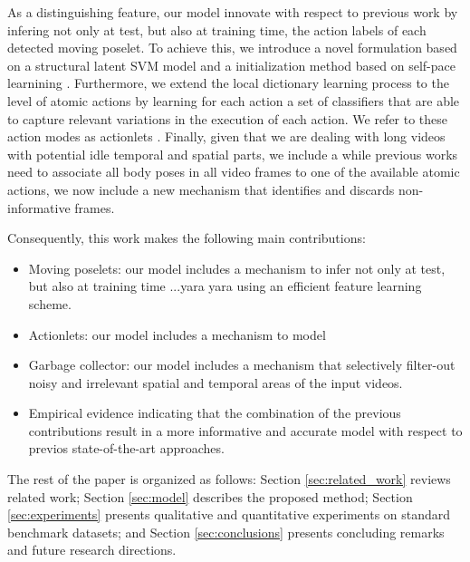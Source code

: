 As a distinguishing feature, our model innovate with respect to previous work by
infering not only at test, but also at training time, the action labels of each
detected moving poselet. To achieve this, we introduce a novel formulation based
on a structural latent SVM model \cite{} and a initialization method based on
self-pace learnining \cite{}. Furthermore, we extend the local dictionary
learning process to the level of atomic actions by learning for each action a
set of classifiers that are able to capture relevant variations in the execution
of each action. We refer to these action modes as actionlets \cite{}. Finally,
given that we are dealing with long videos with potential idle temporal and
spatial parts, we include a while previous works need to associate all body
poses in all video frames to one of the available atomic actions, we now include
a new mechanism that identifies and discards non-informative frames.

Consequently, this work makes the following main contributions:

\begin{itemize}

\item Moving poselets: our model includes a mechanism to infer not only at
test, but also at training time ...yara yara using an efficient feature
learning scheme.
\item Actionlets: our model includes a mechanism to model

\item Garbage collector: our model includes a mechanism that
selectively filter-out noisy and irrelevant spatial and temporal areas of the
input videos.

 \item Empirical evidence indicating that the combination of the previous
contributions result in a more informative and accurate model with
respect to previos state-of-the-art approaches.

\end{itemize}

The rest of the paper is organized as follows:
Section \ref{sec:related_work} reviews related work;
Section \ref{sec:model} describes the proposed method;
Section \ref{sec:experiments}  presents qualitative and quantitative experiments
on standard benchmark datasets;
and Section \ref{sec:conclusions} presents concluding remarks and future research
directions.
